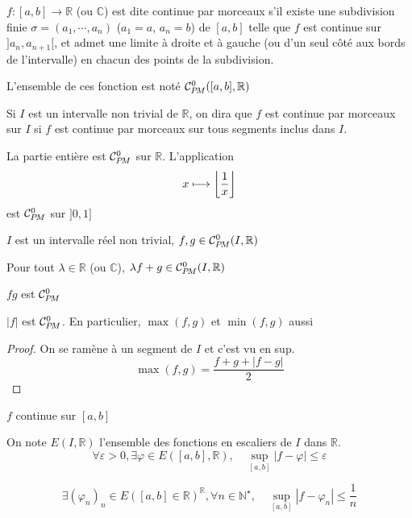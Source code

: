 \begin{dfn}[Rappel]
    $f:[a, b]\longrightarrow\mathbb R$ (ou $\mathbb C$) est dite continue par morceaux s'il existe une subdivision finie $\sigma=(a_1, \cdots, a_n)$ ($a_1=a$, $a_n=b$) de $[a, b]$ telle que $f$ est continue sur $]a_n, a_{n+1}[$, et admet une limite à droite et à gauche (ou d'un seul côté aux bords de l'intervalle) en chacun des points de la subdivision.

    L'ensemble de ces fonction est noté $\CPM([a, b], \mathbb R)$
\end{dfn}

\begin{dfn}
    Si $I$ est un intervalle non trivial de $\mathbb R$, on dira que $f$ est continue par morceaux sur $I$ si $f$ est continue par morceaux sur tous segments inclus dans $I$.
\end{dfn}

\begin{ex}
    La partie entière est $\CPM$ sur $\mathbb R$. L'application \[
        x\longmapsto \left\lfloor\frac1x\right\rfloor
    \]
    est $\CPM$ sur $]0, 1]$
\end{ex}

\begin{prop}
    \Hyp $I$ est un intervalle réel non trivial, $f,g\in \CPM(I, \mathbb R)$
    \begin{concenum}
    \item Pour tout $\lambda\in\mathbb R$ (ou $\mathbb C$), $\lambda f+g\in\CPM(I, \mathbb R)$
    \item $fg$ est $\CPM$
    \item $|f|$ est $\CPM$. En particulier, $\max (f,g)$ et $\min (f,g)$ aussi
    \end{concenum}
\end{prop}

\begin{proof}
    On se ramène à un segment de $I$ et c'est vu en sup. \[
        \max(f,g)=\frac{f+g+|f-g|}2
    \]
\end{proof}

\begin{thm}[Rappel]
    \Hyp $f$ continue sur $[a,b]$
   \begin{concenum}
   \item  On note $E(I, \mathbb R)$ l'ensemble des fonctions en escaliers de $I$ dans $\mathbb R$. \[
           \forall \varepsilon>0, \exists \varphi\in E([a, b], \mathbb R), \quad \sup_{[a, b]}|f-\varphi|\leq \varepsilon
       \]
   \item \[
        \exists (\varphi_n)_n\in E([a,b]\in\mathbb R)^{\mathbb R}, \forall n\in\mathbb N^\star, \quad \sup_{[a,b]}|f-\varphi_n|\leq\frac1n
       \]
   \end{concenum}
\end{thm}

